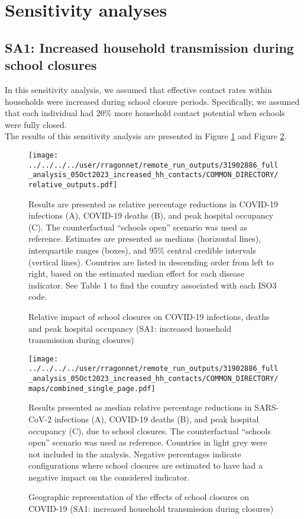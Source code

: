 \section{Sensitivity analyses}

\subsection{SA1: Increased household transmission during school closures}
In this sensitivity analysis, we assumed that effective contact rates within households were increased during school closure periods. 
Specifically, we assumed that each individual had 20\% more household contact potential when schools were fully closed.\\
The results of this sensitivity analysis are presented in Figure \ref{fig:SA1_rel_outputs} and Figure \ref{fig:SA1_maps}.

\begin{figure}[!ht]
    \begin{center}
    \texttt{[image: ../../../../user/rragonnet/remote\_run\_outputs/31902886\_full\_analysis\_05Oct2023\_increased\_hh\_contacts/COMMON\_DIRECTORY/relative\_outputs.pdf]}
    \end{center}
    \caption{Relative impact of school closures on COVID-19 infections, deaths and peak hospital occupancy (SA1: increased household transmission during closures)} 
    Results are presented as relative percentage reductions in COVID-19 infections (A), 
    COVID-19 deaths (B), and peak hospital occupancy (C). The counterfactual ``schools open'' scenario was used as reference. 
    Estimates are presented as medians (horizontal lines), interquartile ranges (boxes), and 95\% central credible intervals (vertical lines). 
    Countries are listed in descending order from left to right, based on the estimated median effect for each disease indicator. See Table 1 to find the country associated with each ISO3 code. 
    \label{fig:SA1_rel_outputs}
\end{figure}

\begin{figure}[!ht]
    \begin{center}
    \texttt{[image: ../../../../user/rragonnet/remote\_run\_outputs/31902886\_full\_analysis\_05Oct2023\_increased\_hh\_contacts/COMMON\_DIRECTORY/maps/combined\_single\_page.pdf]}
    \end{center}
    \caption{Geographic representation of the effects of school closures on COVID-19 (SA1: increased household transmission during closures)} 
    Results presented as median relative percentage reductions in SARS-CoV-2 infections (A), COVID-19 deaths (B), and peak hospital occupancy (C), due to school closures. The counterfactual “schools open” scenario was used as reference. Countries in light grey were not included in the analysis. Negative percentages indicate configurations where school closures are estimated to have had a negative impact on the considered indicator.
    \label{fig:SA1_maps}
\end{figure}



